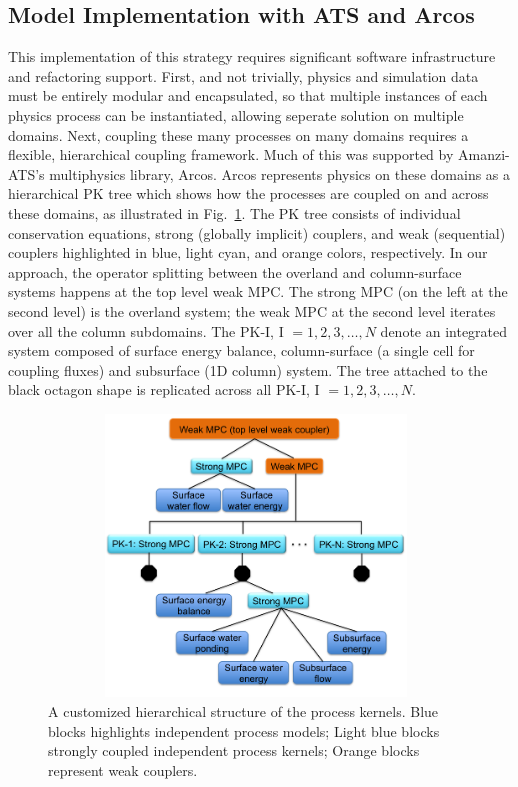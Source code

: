 \documentclass[review]{elsarticle}
\begin{document}
\subsection{Model Implementation with ATS and Arcos}
This implementation of this strategy requires significant software infrastructure and refactoring support.
First, and not trivially, physics and simulation data must be entirely modular and encapsulated, so that multiple instances of each physics process can be instantiated, allowing seperate solution on multiple domains.
Next, coupling these many processes on many domains requires a flexible, hierarchical coupling framework.
Much of this was supported by Amanzi-ATS's multiphysics library, Arcos\cite{ecoon2016managing}.
Arcos represents physics on these domains as a hierarchical PK tree which shows how the processes are coupled on and across these domains, as illustrated in Fig.~\ref{pk-tree}.
The PK tree consists of individual conservation equations, strong (globally implicit) couplers, and weak (sequential) couplers highlighted in blue, light cyan, and orange colors, respectively.
In our approach, the operator splitting between the overland and column-surface systems happens at the top level weak MPC.
The strong MPC (on the left at the second level) is the overland system; the weak MPC at the second level iterates over all the column subdomains.
The PK-I, I $=1,2,3, \dots, N$ denote an integrated system composed of surface energy balance, column-surface (a single cell for coupling fluxes) and subsurface (1D column) system.
The tree attached to the black octagon shape is replicated across all PK-I, I $=1,2,3, \dots, N$.
%
\begin{figure}[!htpb]
\centering
\includegraphics[height = 7.5cm, width=11cm]{figures/process-tree1.png}
\caption{A customized hierarchical structure of the process kernels. Blue blocks highlights independent process models; Light blue blocks strongly coupled independent process kernels; Orange blocks represent weak couplers.}
\label{pk-tree}
\end{figure}
\end{document}
